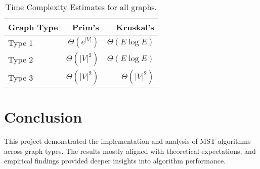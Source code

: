 \documentclass{article}
\begin{document}
\vspace{.5cm}
\begin{table}[h!]
\centering
\begin{tabular}{lrr}
\toprule
\textbf{Graph Type} & \textbf{Prim's} & \textbf{Kruskal's} \\
\midrule
Type 1 & $\Theta(e^{|V|})$ & $\Theta(E\log E)$ \\
\hline
Type 2 & $\Theta(|V|^2)$ & $\Theta(E\log E)$ \\
\hline
Type 3 & $\Theta(|V|^2)$ & $\Theta(|V|^2)$ \\
\bottomrule
\end{tabular}
\caption{Time Complexity Estimates for all graphs.}
\label{tab:tc_graphs}
\end{table}

\section*{Conclusion}
This project demonstrated the implementation and analysis of MST algorithms across graph types. The results mostly aligned with theoretical expectations, and empirical findings provided deeper insights into algorithm performance.
\end{document}
